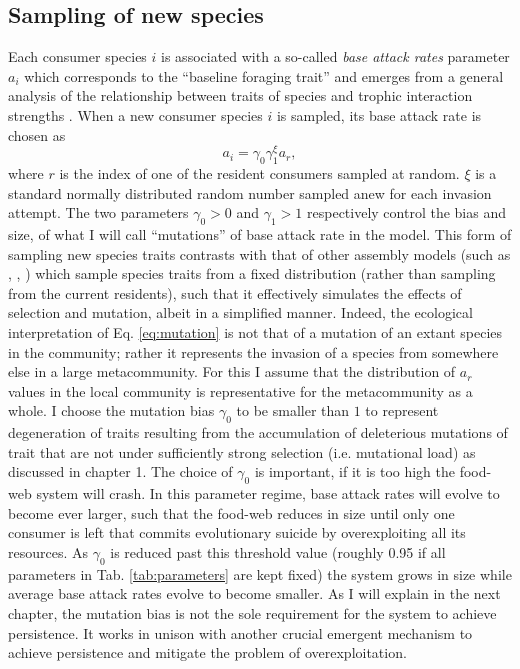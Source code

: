 \documentclass[a4paper]{report}
\begin{document}
\subsection{Sampling of new species}
\label{sec:sampling-new-species}

Each consumer species $i$ is associated with a so-called \emph{base attack rates} parameter $a_i$ which corresponds to the ``baseline foraging trait'' and
emerges from a general analysis of the relationship between traits of species
and trophic interaction strengths
\citep{rossberg09:_how_troph_inter_stren_depen_trait}. When a new
consumer species $i$ is sampled, its base attack rate is chosen as
\begin{equation}
  a_{i}=\gamma_{0}\gamma_{1}^{\xi}a_{r},\label{eq:mutation}
\end{equation}
where $r$ is the index of one of the resident consumers sampled at
random. $\xi$ is a standard normally distributed random number sampled anew for each invasion attempt. The two parameters $\gamma_0>0$ and
$\gamma_1>1$ respectively control the bias and size, of what I will call
``mutations'' of base attack rate in the model. This form of sampling new species traits contrasts with that of other assembly models (such as \citep{Pawar2009}, \citep{Pawar2015}, \citep{Bastolla2005a}) which sample species traits from a fixed distribution (rather than sampling from the current residents), such that it effectively simulates the effects of selection and mutation, albeit in a simplified manner. Indeed, the ecological
interpretation of Eq. \eqref{eq:mutation} is not that of a
mutation of an extant species in the community; rather it represents
the invasion of a species from somewhere else in a large
metacommunity. For this I assume that the distribution of $a_{r}$
values in the local community is representative for the metacommunity
as a whole. I choose the mutation bias $\gamma_{0}$ to be smaller
than $1$ to represent degeneration of traits resulting from the accumulation of deleterious mutations of trait that are not under
sufficiently strong selection (i.e. mutational load) as discussed in chapter 1. The choice of $\gamma_0$ is important, if it is too high the food-web system will crash. In this parameter regime, base attack rates will evolve to become ever larger, such that the food-web reduces in size until only one consumer is left that commits evolutionary suicide by overexploiting all its resources. As $\gamma_0$
is reduced past this threshold value (roughly 0.95 if all parameters in Tab. \ref{tab:parameters} are kept fixed) the system grows in size while average base attack rates evolve to become smaller. As I will explain in the next chapter, the mutation bias is not the sole requirement for the system to achieve persistence. It works in unison with another crucial emergent mechanism to achieve persistence and mitigate the problem of overexploitation.\\
\end{document}
